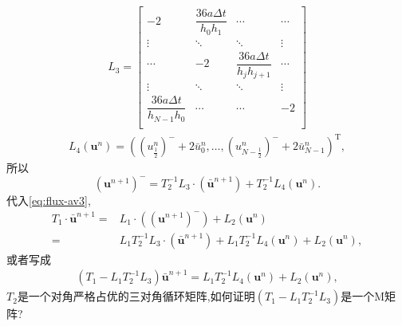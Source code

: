 \documentclass[a4paper, 11pt]{ctexart}
\numberwithin{equation}{section}
\numberwithin{figure}{section}
\newcommand\bu{\bm{u}}
\begin{document}
\begin{align}
  L_3=\begin{bmatrix}
    -2 & \dfrac{36a\Delta t}{h_0h_{1}} & \cdots & \cdots \\
    \vdots & \ddots  & \ddots   & \vdots \\
    \cdots & -2 & \dfrac{36a\Delta t}{h_jh_{j+1}} & \cdots \\
    \vdots & \ddots  & \ddots   & \vdots \\
    \dfrac{36a\Delta t}{h_{N-1}h_{0}} & \cdots & \cdots & -2 \\
    \end{bmatrix}
\end{align}
\begin{align}
  L_4(\bu^n)=((u^{n}_{\frac12})^{-}+2\bar{u}^n_0,\dots,
  (u^{n}_{N-\frac12})^{-}+2\bar{u}^n_{N-1})^\mathrm{T},
\end{align}
所以
\begin{equation}
  (\bu^{n+1})^{-}=T_2^{-1}L_3\cdot(\bar{\bu}^{n+1})+T_2^{-1}L_4(\bu^n).
  \label{eq:flux-av4}
\end{equation}
代入\eqref{eq:flux-av3},
\begin{align}
  T_1\cdot\bar{\bu}^{n+1}=&L_1\cdot((\bu^{n+1})^{-})+L_2(\bu^n) \nonumber \\
  =&L_1T_2^{-1}L_3\cdot(\bar{\bu}^{n+1})+L_1T_2^{-1}L_4(\bu^n)+L_2(\bu^n) \nonumber,
\end{align}
或者写成
\begin{align}
  (T_1-L_1T_2^{-1}L_3)\bar{\bu}^{n+1}=L_1T_2^{-1}L_4(\bu^n)+L_2(\bu^n) \nonumber,
\end{align}
$T_2$是一个对角严格占优的三对角循环矩阵,如何证明$(T_1-L_1T_2^{-1}L_3)$是一个M矩
阵?
\end{document}

